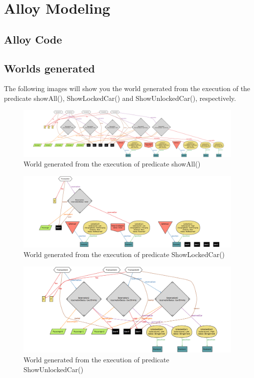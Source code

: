 \section{Alloy Modeling} \label{sec:alloy}

\subsection{Alloy Code} \label{code}


\clearpage

\subsection{Worlds generated} \label{world}

The following images will show you the world generated from the execution of the predicate showAll(), ShowLockedCar() and ShowUnlockedCar(), respectively.

\begin{figure}[htbp]
\centering
\includegraphics[width=1.5\textwidth, angle=90]{Alloy/showAll.png}
\caption{World generated from the execution of predicate showAll()}
\end{figure}
\clearpage

\begin{figure}[htbp]
\centering
\includegraphics[width=1.5\textwidth, angle=90]{Alloy/ShowLockedCar.png}
\caption{World generated from the execution of predicate ShowLockedCar()}
\end{figure}
\clearpage

\begin{figure}[htbp]
\centering
\includegraphics[width=1.5\textwidth, angle=90]{Alloy/ShowUnlockedCar}
\caption{World generated from the execution of predicate ShowUnlockedCar()}
\end{figure}
\clearpage